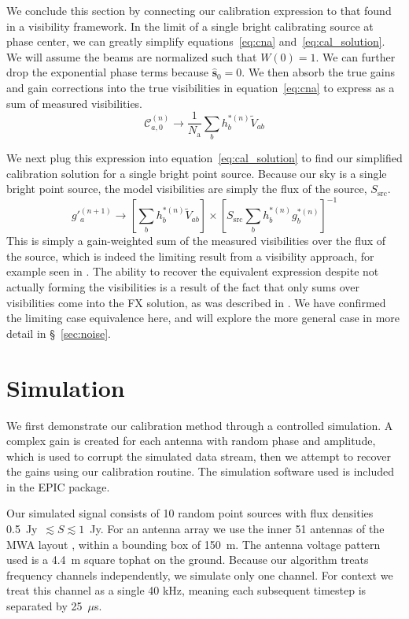 \documentclass[a4paper,fleqn,usenatbib]{../mnras}
\newcommand{\Nant}{\ensuremath{N_{\mathrm{a}}}}
\newcommand{\spix}{\ensuremath{\hat{\mathbf{s}}_{0}}}
\newcommand{\beamtheta}{\ensuremath{W}}
\newcommand{\V}{\ensuremath{\widetilde{V}}}
\begin{document}
We conclude this section by connecting our calibration expression to that found in a visibility framework. In the limit of a single bright calibrating source at phase center, we can greatly simplify equations~\ref{eq:cna} and~\ref{eq:cal_solution}. We will assume the beams are normalized such that $\beamtheta(0)=1$. We can further drop the exponential phase terms because $\spix=0$. We then absorb the true gains and gain corrections into the true visibilities in equation~\ref{eq:cna} to express as a sum of measured visibilities.
\begin{equation}
\mathcal{C}^{(n)}_{a,0} \rightarrow \frac{1}{\Nant}\sum_b h^{*(n)}_b \V_{ab}
\end{equation}

We next plug this expression into equation~\ref{eq:cal_solution} to find our simplified calibration solution for a single bright point source. Because our sky is a single bright point source, the model visibilities are simply the flux of the source, $S_{\mathrm{src}}$.
\begin{equation}
g'^{(n+1)}_a \rightarrow \left[\sum_b h^{*(n)}_b \V_{ab}\right] \times \left[S_{\mathrm{src}}\sum_b h^{*(n)}_b g^{*(n)}_b\right]^{-1}
\end{equation}
This is simply a gain-weighted sum of the measured visibilities over the flux of the source, which is indeed the limiting result from a visibility approach, for example seen in \citealt{mit08}. The ability to recover the equivalent expression despite not actually forming the visibilities is a result of the fact that only sums over visibilities come into the FX solution, as was described in \citealt{mor11}. We have confirmed the limiting case equivalence here, and will explore the more general case in more detail in \S~\ref{sec:noise}.


\section{Simulation}\label{sec:sim}
We first demonstrate our calibration method through a controlled simulation. A complex gain is created for each antenna with random phase and amplitude, which is used to corrupt the simulated data stream, then we attempt to recover the gains using our calibration routine. The simulation software used is included in the EPIC package.

Our simulated signal consists of 10 random point sources with flux densities 0.5~Jy~$\lesssim S \lesssim 1$~Jy. For an antenna array we use the inner 51 antennas of the MWA layout \citep{bea12}, within a bounding box of 150~m. The antenna voltage pattern used is a 4.4~m square tophat on the ground. Because our algorithm treats frequency channels independently, we simulate only one channel. For context we treat this channel as a single 40 kHz, meaning each subsequent timestep is separated by 25~$\mu$s.
\end{document}
